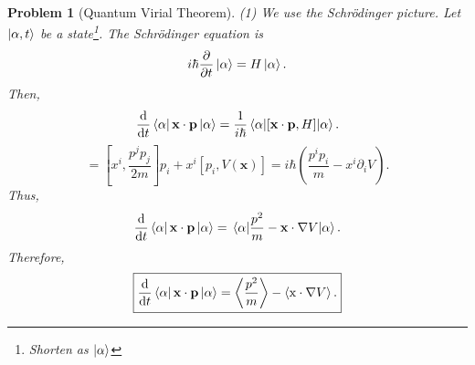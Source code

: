 \documentclass{article}
\theoremstyle{1}
\newtheorem{problem}{Problem}
\newcommand{\pa}{\partial}
\begin{document}
\begin{problem}[Quantum Virial Theorem]
    (1) We use the Schr\"odinger picture. Let $\ket{\alpha,t}$ be a state\footnote{Shorten as $\ket{\alpha}$}. The Schr\"odinger equation is
    \begin{equation}
        i\hbar \frac{\pa}{\pa t}\ket{\alpha}=H\ket{\alpha}.
    \end{equation}
    Then,
    \begin{equation}
        \frac{\dd}{\dd{t}}\bra{\alpha}\mathbf{x}\cdot\mathbf{p}\ket{\alpha}=\frac{1}{i\hbar}\expval{[\mathbf{x}\cdot\mathbf{p},H]}{\alpha}.
    \end{equation}
    \begin{equation}
        [x^ip_i,\frac{p^jp_j}{2m}+V(\mathbf{x})]=[x^i,\frac{p^jp_j}{2m}]p_i+x^i[p_i,V(\mathbf{x})]=i \hbar\left(\frac{p^ip_i}{m}-x^i\pa _i V\right).
    \end{equation}
    Thus,
    \begin{equation}
         \frac{\dd}{\dd{t}}\bra{\alpha}\mathbf{x}\cdot\mathbf{p}\ket{\alpha}=\expval{\frac{p^2}{m}-\mathbf{x}\cdot \nabla V}{\alpha}.
    \end{equation}
    Therefore,
    \begin{equation}
        \boxed{ \frac{\dd}{\dd{t}}\bra{\alpha}\mathbf{x}\cdot\mathbf{p}\ket{\alpha}=\expval{\frac{p^2}{m}}-\expval{\mathrm{x}\cdot\nabla V}.}
    \end{equation}
    

\end{problem}
\end{document}
